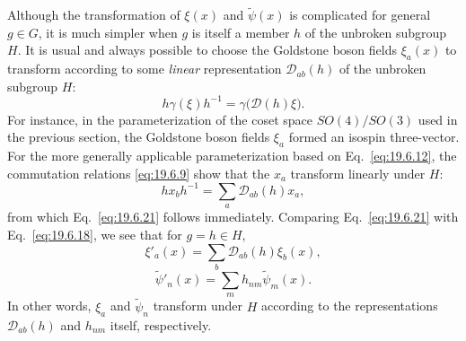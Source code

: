 Although the transformation of $\xi(x)$ and $\widetilde\psi(x)$ is complicated for general $g\in G$, it is much simpler when $g$ is itself a member $h$ of the unbroken subgroup $H$. It is usual and always possible to choose the Goldstone boson fields $\xi_a(x)$ to transform according to some \emph{linear} representation $\mathcal D_{ab}(h)$ of the unbroken subgroup $H$:
\begin{equation}
h\gamma(\xi)h^{-1}
=\gamma\bigl(\mathcal D(h)\xi\bigr).
\tag{19.6.21}\label{eq:19.6.21}
\end{equation}
For instance, in the parameterization of the coset space $SO(4)/SO(3)$ used in the previous section, the Goldstone boson fields $\xi_a$ formed an isospin three-vector. For the more generally applicable parameterization based on Eq.~\eqref{eq:19.6.12}, the commutation relations \eqref{eq:19.6.9} show that the $x_a$ transform linearly under $H$:
\begin{equation}
hx_bh^{-1}=\sum_a\mathcal D_{ab}(h)x_a,
\tag{19.6.22}\label{eq:19.6.22}
\end{equation}
from which Eq.~\eqref{eq:19.6.21} follows immediately. Comparing Eq.~\eqref{eq:19.6.21} with Eq.~\eqref{eq:19.6.18}, we see that for $g=h\in H$,
\begin{equation}
\xi'_a(x)=\sum_b\mathcal D_{ab}(h)\xi_b(x),
\tag{19.6.23}\label{eq:19.6.23}
\end{equation}
\begin{equation}
\widetilde\psi'_n(x)=\sum_mh_{nm}\widetilde\psi_m(x).
\tag{19.6.24}\label{eq:19.6.24}
\end{equation}
In other words, $\xi_a$ and $\widetilde\psi_n$ transform under $H$ according to the representations $\mathcal D_{ab}(h)$ and $h_{nm}$ itself, respectively.

